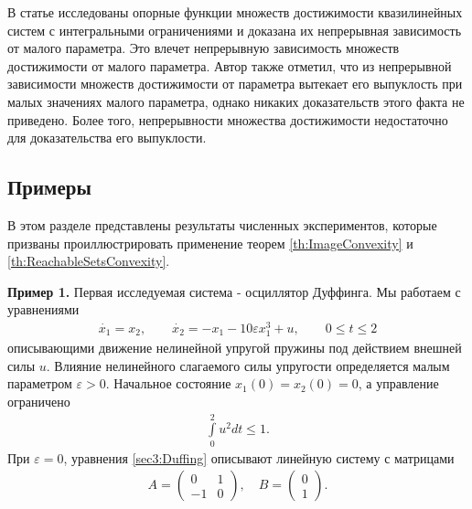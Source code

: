 \documentclass[../main.tex]{subfiles}
\begin{document}
\begin{zam}  
    В статье \cite{Albrecht2} исследованы опорные функции множеств достижимости квазилинейных систем с интегральными ограничениями и доказана их непрерывная зависимость от малого параметра.
    Это влечет непрерывную зависимость множеств достижимости от малого параметра. 
    Автор также отметил, что из непрерывной зависимости множеств достижимости от параметра вытекает его выпуклость при малых значениях малого параметра, однако никаких доказательств этого факта не приведено. 
    Более того, непрерывности множества достижимости недостаточно для доказательства его выпуклости.
\end{zam}

\subsection{Примеры}

В этом разделе представлены результаты численных экспериментов, которые призваны проиллюстрировать применение теорем \ref{th:ImageConvexity} и \ref{th:ReachableSetsConvexity}. 

\textbf{Пример 1.}
    Первая исследуемая система - осциллятор Дуффинга. 
    Мы работаем с уравнениями
    \begin{gather}\label{sec3:Duffing}
        \dot{x_1} = x_2, \qquad
        \dot{x_2} = -x_1 - 10 \varepsilon x_1^3 + u ,\qquad 0\leqslant t  \leqslant 2
    \end{gather}
    описывающими движение нелинейной упругой пружины под действием внешней силы $u$. 
    Влияние нелинейного слагаемого силы упругости определяется малым параметром $\varepsilon > 0$. 
Начальное состояние $x_1(0) = x_2(0) = 0 $, а управление ограничено 
    \begin{gather}\label{Duffing_controls}
        \int\limits_0^2u^2dt \leqslant 1.
    \end{gather}
    При $\varepsilon = 0$, уравнения \eqref{sec3:Duffing} описывают линейную систему с матрицами 
    \begin{gather*}
        A = \begin{pmatrix} 0 & 1\\
            -1 & 0
        \end{pmatrix}, \quad B = \begin{pmatrix}
            0\\
            1
        \end{pmatrix}.
    \end{gather*}
    
\end{document}
